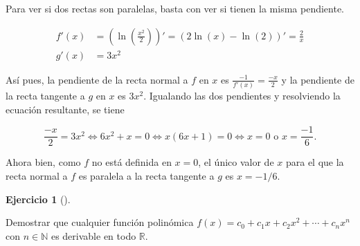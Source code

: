 \documentclass[
  spanish,
  a4paper,
]{scrreport}
\theoremstyle{definition}
\newtheorem{exercise}{Ejercicio}[chapter]
\theoremstyle{remark}
\begin{document}
\begin{tcolorbox}[enhanced jigsaw, arc=.35mm, bottomrule=.15mm, bottomtitle=1mm, breakable, colback=white, colbacktitle=quarto-callout-tip-color!10!white, colframe=quarto-callout-tip-color-frame, coltitle=black, left=2mm, leftrule=.75mm, opacityback=0, opacitybacktitle=0.6, rightrule=.15mm, title=\textcolor{quarto-callout-tip-color}{\faLightbulb}\hspace{0.5em}{Solución}, titlerule=0mm, toprule=.15mm, toptitle=1mm]

Para ver si dos rectas son paralelas, basta con ver si tienen la misma
pendiente.

\begin{align*}
f'(x) &= \left(\ln\left(\frac{x^2}{2}\right)\right)' = (2\ln(x) - \ln(2))' = \frac{2}{x}\\ 
g'(x) &= 3x^2
\end{align*}

Así pues, la pendiente de la recta normal a \(f\) en \(x\) es
\(\frac{-1}{f'(x)} = \frac{-x}{2}\) y la pendiente de la recta tangente
a \(g\) en \(x\) es \(3x^2\). Igualando las dos pendientes y resolviendo
la ecuación resultante, se tiene

\[
\frac{-x}{2} = 3x^2 \Leftrightarrow 6x^2 + x =0 \Leftrightarrow x(6x+1) = 0 \Leftrightarrow x=0 \mbox{ o } x=\frac{-1}{6}.
\]

Ahora bien, como \(f\) no está definida en \(x=0\), el único valor de
\(x\) para el que la recta normal a \(f\) es paralela a la recta
tangente a \(g\) es \(x=-1/6\).

\end{tcolorbox}

\begin{exercise}[]\protect\hypertarget{exr-derivada-funcion-polinomica}{}\label{exr-derivada-funcion-polinomica}

Demostrar que cualquier función polinómica
\(f(x)=c_0+c_1x+c_2x^2+\cdots+c_nx^n\) con \(n\in\mathbb{N}\) es
derivable en todo \(\mathbb{R}\).

\end{exercise}
\end{document}
